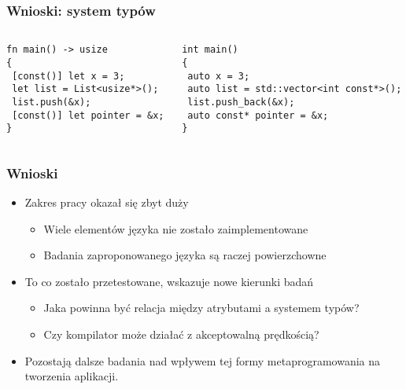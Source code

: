 \begin{frame}[fragile]
	\frametitle{Wnioski: system typów}

	\begin{columns}
		\begin{column}{0.5\textwidth}
			\begin{lstlisting}[caption={const w C-=-1}]
fn main() -> usize
{
 [const()] let x = 3;
 let list = List<usize*>();
 list.push(&x);
 [const()] let pointer = &x;
}
			\end{lstlisting}
		\end{column}
		\begin{column}{0.5\textwidth}
			\begin{lstlisting}[caption={const w C++}]
int main()
{
 auto x = 3;
 auto list = std::vector<int const*>();
 list.push_back(&x);
 auto const* pointer = &x;
}

			\end{lstlisting}
		\end{column}
	\end{columns}
\end{frame}



\begin{frame}
	\frametitle{Wnioski}

	\begin{itemize}
		\item Zakres pracy okazał się zbyt duży\begin{itemize}
			\item Wiele elementów języka nie zostało zaimplementowane
			\item Badania zaproponowanego języka są raczej powierzchowne
		\end{itemize}
		\item To co zostało przetestowane, wskazuje nowe kierunki badań\begin{itemize}
			\item Jaka powinna być relacja między atrybutami a systemem typów?
			\item Czy kompilator może działać z akceptowalną prędkością?
		\end{itemize}
		\item Pozostają dalsze badania nad wpływem tej formy metaprogramowania na tworzenia aplikacji.
	\end{itemize}

\end{frame}
